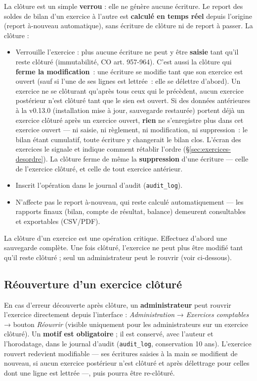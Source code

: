 \documentclass[a4paper,11pt,oneside]{article}
\begin{document}
La clôture est un simple \textbf{verrou} : elle ne génère aucune écriture. Le report des soldes de bilan d'un exercice à l'autre est \textbf{calculé en temps réel} depuis l'origine (report à-nouveau automatique), sans écriture de clôture ni de report à passer. La clôture :

\begin{itemize}
    \item Verrouille l'exercice : plus aucune écriture ne peut y être \textbf{saisie} tant qu'il reste clôturé (immutabilité, CO art. 957-964). C'est aussi la clôture qui \textbf{ferme la modification}~: une écriture se modifie tant que son exercice est ouvert (sauf si l'une de ses lignes est lettrée~: elle se délettre d'abord). Un exercice ne se clôturant qu'après tous ceux qui le précèdent, aucun exercice postérieur n'est clôturé tant que le sien est ouvert. Si des données antérieures à la v0.13.0 (installation mise à jour, sauvegarde restaurée) portent déjà un exercice clôturé après un exercice ouvert, \textbf{rien} ne s'enregistre plus dans cet exercice ouvert --- ni saisie, ni règlement, ni modification, ni suppression~: le bilan étant cumulatif, toute écriture y changerait le bilan clos. L'écran des exercices le signale et indique comment rétablir l'ordre (\S\ref{sec:exercices-desordre}). La clôture ferme de même la \textbf{suppression} d'une écriture --- celle de l'exercice clôturé, et celle de tout exercice antérieur.
    \item Inscrit l'opération dans le journal d'audit (\texttt{audit\_log}).
    \item N'affecte pas le report à-nouveau, qui reste calculé automatiquement — les rapports finaux (bilan, compte de résultat, balance) demeurent consultables et exportables (CSV/PDF).
\end{itemize}

\begin{keshwarning}
La clôture d'un exercice est une opération critique. Effectuez d'abord une sauvegarde complète. Une fois clôturé, l'exercice ne peut plus être modifié tant qu'il reste clôturé ; seul un administrateur peut le rouvrir (voir ci-dessous).
\end{keshwarning}

\subsection{Réouverture d'un exercice clôturé}\label{sec:reouverture-exercice}

En cas d'erreur découverte après clôture, un \textbf{administrateur} peut rouvrir l'exercice directement depuis l'interface : \emph{Administration} → \emph{Exercices comptables} → bouton \emph{Réouvrir} (visible uniquement pour les administrateurs sur un exercice clôturé). Un \textbf{motif est obligatoire} ; il est conservé, avec l'auteur et l'horodatage, dans le journal d'audit (\texttt{audit\_log}, conservation 10 ans). L'exercice rouvert redevient modifiable --- ses écritures saisies à la main se modifient de nouveau, si aucun exercice postérieur n'est clôturé et après délettrage pour celles dont une ligne est lettrée ---, puis pourra être re-clôturé.
\end{document}
